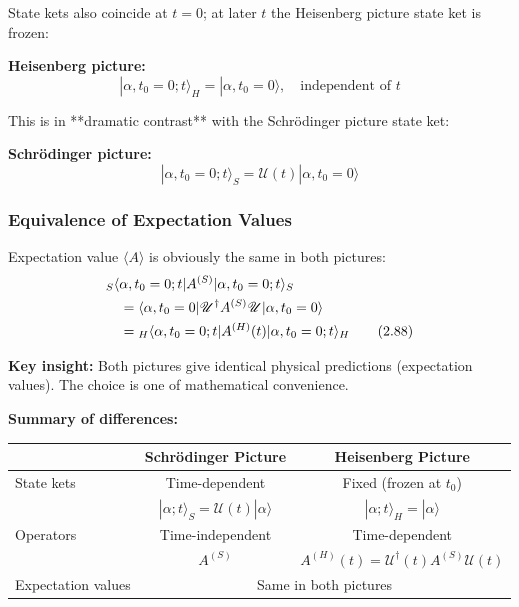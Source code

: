 \documentclass[11pt,a4paper]{article}
\begin{document}
State kets also coincide at $t = 0$; at later $t$ the Heisenberg picture state ket is frozen:

\textbf{Heisenberg picture:}
\begin{equation}
|\alpha, t_0 = 0; t\rangle_H = |\alpha, t_0 = 0\rangle, \quad \text{independent of } t
\tag{2.86}
\end{equation}

This is in **dramatic contrast** with the Schrödinger picture state ket:

\textbf{Schrödinger picture:}
\begin{equation}
|\alpha, t_0 = 0; t\rangle_S = \mathscr{U}(t)|\alpha, t_0 = 0\rangle
\tag{2.87}
\end{equation}

\subsubsection{Equivalence of Expectation Values}

Expectation value $\langle A \rangle$ is obviously the same in both pictures:
\begin{align}
&{}_S\langle\alpha, t_0 = 0; t|A^{(S)}|\alpha, t_0 = 0; t\rangle_S \notag \\
&\quad = \langle\alpha, t_0 = 0|\mathscr{U}^\dagger A^{(S)}\mathscr{U}|\alpha, t_0 = 0\rangle \notag \\
&\quad = {}_H\langle\alpha, t_0 = 0; t|A^{(H)}(t)|\alpha, t_0 = 0; t\rangle_H
\tag{2.88}
\end{align}

\textbf{Key insight:} Both pictures give identical physical predictions (expectation values). The choice is one of mathematical convenience.

\textbf{Summary of differences:}

\begin{center}
\begin{tabular}{|l|c|c|}
\hline
& \textbf{Schrödinger Picture} & \textbf{Heisenberg Picture} \\
\hline
State kets & Time-dependent & Fixed (frozen at $t_0$) \\
& $|\alpha; t\rangle_S = \mathscr{U}(t)|\alpha\rangle$ & $|\alpha; t\rangle_H = |\alpha\rangle$ \\
\hline
Operators & Time-independent & Time-dependent \\
& $A^{(S)}$ & $A^{(H)}(t) = \mathscr{U}^\dagger(t)A^{(S)}\mathscr{U}(t)$ \\
\hline
Expectation values & \multicolumn{2}{c|}{Same in both pictures} \\
\hline
\end{tabular}
\end{center}
\end{document}
